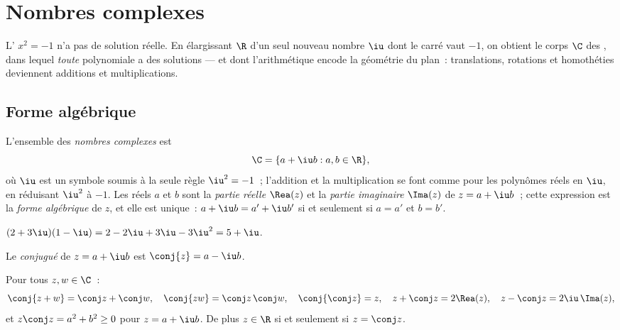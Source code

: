 \chapter{Nombres complexes}\label{ch:g12:complex}

L' $x^2 = -1$ n'a pas de solution réelle. En élargissant $\R$ d'un
seul nouveau nombre $\iu$ dont le carré vaut $-1$, on obtient le corps $\C$
des , dans lequel \emph{toute}  polynomiale a des
solutions --- et dont l'arithmétique encode la géométrie du plan~:
translations, rotations et homothéties deviennent additions et
multiplications.

\section{Forme algébrique}

\begin{definition}\label{def:g12:complex:def}
L'ensemble des \emph{nombres complexes} est
\[
\C = \{a + \iu b : a, b \in \R\},
\]
où $\iu$ est un symbole soumis à la seule règle $\iu^2 = -1$~; l'addition et
la multiplication se font comme pour les polynômes réels en $\iu$, en
réduisant $\iu^2$ à $-1$. Les réels $a$ et $b$ sont la \emph{partie réelle}
$\Rea(z)$ et la \emph{partie imaginaire} $\Ima(z)$ de $z = a + \iu b$~;
cette expression est la \emph{forme algébrique} de $z$, et elle est unique~:
$a + \iu b = a' + \iu b'$ si et seulement si $a = a'$ et $b = b'$.
\end{definition}

\begin{example}
$(2 + 3\iu)(1 - \iu) = 2 - 2\iu + 3\iu - 3\iu^2 = 5 + \iu$.
\end{example}

\begin{definition}[Conjugué]\label{def:g12:complex:conjugate}
Le \emph{conjugué} de $z = a + \iu b$ est
$\conj{z} = a - \iu b$.
\end{definition}

\begin{proposition}\label{prop:g12:complex:conjugate}
Pour tous $z, w \in \C$~:
\[
\conj{z + w} = \conj z + \conj w, \quad
\conj{zw} = \conj z\,\conj w, \quad
\conj{\conj z} = z, \quad
z + \conj z = 2\Rea(z), \quad
z - \conj z = 2\iu\,\Ima(z),
\]
et $z\conj z = a^2 + b^2 \geq 0$ pour $z = a + \iu b$. De plus $z \in \R$
si et seulement si $z = \conj z$.
\end{proposition}

